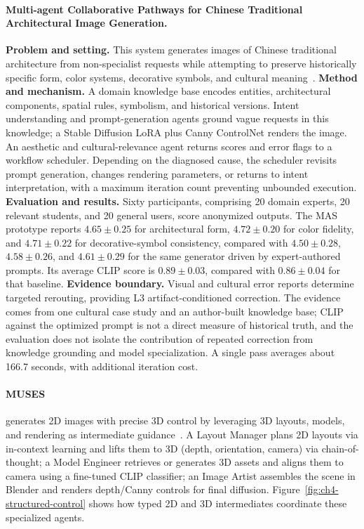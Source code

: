 \paragraph{Multi-agent Collaborative Pathways for Chinese Traditional Architectural Image Generation.}
\textbf{Problem and setting.} This system generates images of Chinese traditional architecture from non-specialist requests while attempting to preserve historically specific form, color systems, decorative symbols, and cultural meaning~\cite{avgdoi101038s41598025181307}. \textbf{Method and mechanism.} A domain knowledge base encodes entities, architectural components, spatial rules, symbolism, and historical versions. Intent understanding and prompt-generation agents ground vague requests in this knowledge; a Stable Diffusion LoRA plus Canny ControlNet renders the image. An aesthetic and cultural-relevance agent returns scores and error flags to a workflow scheduler. Depending on the diagnosed cause, the scheduler revisits prompt generation, changes rendering parameters, or returns to intent interpretation, with a maximum iteration count preventing unbounded execution. \textbf{Evaluation and results.} Sixty participants, comprising 20 domain experts, 20 relevant students, and 20 general users, score anonymized outputs. The MAS prototype reports $4.65\pm0.25$ for architectural form, $4.72\pm0.20$ for color fidelity, and $4.71\pm0.22$ for decorative-symbol consistency, compared with $4.50\pm0.28$, $4.58\pm0.26$, and $4.61\pm0.29$ for the same generator driven by expert-authored prompts. Its average CLIP score is $0.89\pm0.03$, compared with $0.86\pm0.04$ for that baseline. \textbf{Evidence boundary.} Visual and cultural error reports determine targeted rerouting, providing L3 artifact-conditioned correction. The evidence comes from one cultural case study and an author-built knowledge base; CLIP against the optimized prompt is not a direct measure of historical truth, and the evaluation does not isolate the contribution of repeated correction from knowledge grounding and model specialization. A single pass averages about 166.7 seconds, with additional iteration cost.

\paragraph{MUSES}
 generates 2D images with precise 3D control by leveraging 3D layouts, models, and rendering as intermediate guidance~\cite{ding2025muses}. A Layout Manager plans 2D layouts via in-context learning and lifts them to 3D (depth, orientation, camera) via chain-of-thought; a Model Engineer retrieves or generates 3D assets and aligns them to camera using a fine-tuned CLIP classifier; an Image Artist assembles the scene in Blender and renders depth/Canny controls for final diffusion. Figure~\ref{fig:ch4-structured-control} shows how typed 2D and 3D intermediates coordinate these specialized agents.

